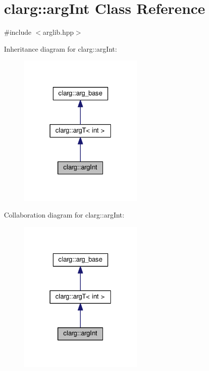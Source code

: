 \hypertarget{classclarg_1_1arg_int}{}\section{clarg\+:\+:arg\+Int Class Reference}
\label{classclarg_1_1arg_int}


{\ttfamily \#include $<$arglib.\+hpp$>$}



Inheritance diagram for clarg\+:\+:arg\+Int\+:\nopagebreak
\begin{figure}[H]
\begin{center}
\leavevmode
\includegraphics[width=172pt]{classclarg_1_1arg_int__inherit__graph}
\end{center}
\end{figure}


Collaboration diagram for clarg\+:\+:arg\+Int\+:\nopagebreak
\begin{figure}[H]
\begin{center}
\leavevmode
\includegraphics[width=172pt]{classclarg_1_1arg_int__coll__graph}
\end{center}
\end{figure}
